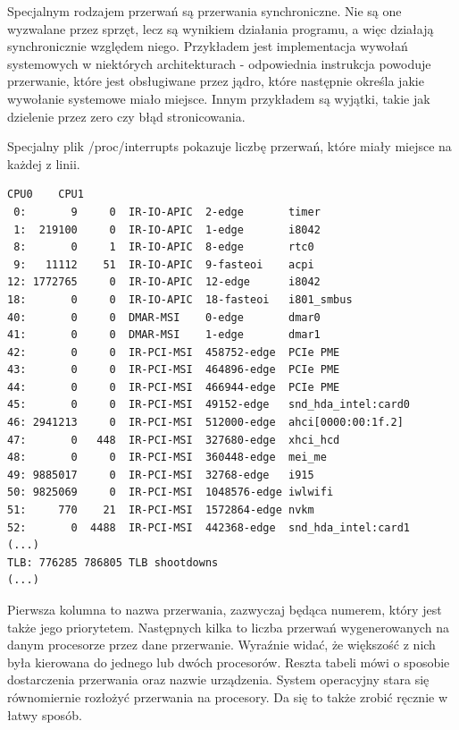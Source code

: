 \documentclass[shortabstract,inz]{iithesis}
\begin{document}
Specjalnym rodzajem przerwań są przerwania synchroniczne. 
Nie są one wyzwalane
przez sprzęt, lecz są wynikiem działania programu, a więc działają
synchronicznie względem niego. Przykładem jest implementacja wywołań
systemowych w niektórych architekturach - odpowiednia
instrukcja powoduje przerwanie, które jest obsługiwane przez jądro, które
następnie określa jakie wywołanie systemowe miało miejsce. Innym przykładem są
wyjątki, takie jak dzielenie przez zero czy błąd stronicowania.



Specjalny plik /proc/interrupts pokazuje liczbę przerwań, które miały miejsce na każdej z linii.

\begin{lstlisting}[caption={Uproszczony plik /proc/interrupts \protect\footnotemark}]
      CPU0    CPU1        
 0:       9     0  IR-IO-APIC  2-edge       timer
 1:  219100     0  IR-IO-APIC  1-edge       i8042
 8:       0     1  IR-IO-APIC  8-edge       rtc0
 9:   11112    51  IR-IO-APIC  9-fasteoi    acpi
12: 1772765     0  IR-IO-APIC  12-edge      i8042
18:       0     0  IR-IO-APIC  18-fasteoi   i801_smbus
40:       0     0  DMAR-MSI    0-edge       dmar0
41:       0     0  DMAR-MSI    1-edge       dmar1
42:       0     0  IR-PCI-MSI  458752-edge  PCIe PME
43:       0     0  IR-PCI-MSI  464896-edge  PCIe PME
44:       0     0  IR-PCI-MSI  466944-edge  PCIe PME
45:       0     0  IR-PCI-MSI  49152-edge   snd_hda_intel:card0
46: 2941213     0  IR-PCI-MSI  512000-edge  ahci[0000:00:1f.2]
47:       0   448  IR-PCI-MSI  327680-edge  xhci_hcd
48:       0     0  IR-PCI-MSI  360448-edge  mei_me
49: 9885017     0  IR-PCI-MSI  32768-edge   i915
50: 9825069     0  IR-PCI-MSI  1048576-edge iwlwifi
51:     770    21  IR-PCI-MSI  1572864-edge nvkm
52:       0  4488  IR-PCI-MSI  442368-edge  snd_hda_intel:card1
(...) 
TLB: 776285 786805 TLB shootdowns
(...)
\end{lstlisting}


Pierwsza kolumna to nazwa przerwania, zazwyczaj będąca numerem, który jest także jego priorytetem. 
Następnych kilka to liczba przerwań wygenerowanych na danym procesorze przez dane przerwanie. 
Wyraźnie widać, że większość z nich była kierowana do jednego lub dwóch procesorów.  
Reszta tabeli mówi o sposobie dostarczenia przerwania oraz nazwie urządzenia. 
System operacyjny stara się równomiernie rozłożyć przerwania na procesory. 
Da się to także zrobić ręcznie w łatwy sposób. 
\end{document}
